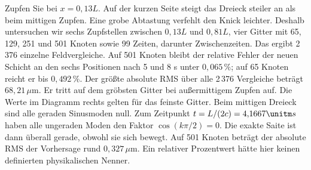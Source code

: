 Zupfen Sie bei \(x=0{,}13L\). Auf der kurzen Seite steigt das Dreieck steiler an als beim mittigen Zupfen. Eine grobe Abtastung verfehlt den Knick leichter. Deshalb untersuchen wir sechs Zupfstellen zwischen \(0{,}13L\) und \(0{,}81L\), vier Gitter mit 65, 129, 251 und 501 Knoten sowie 99 Zeiten, darunter Zwischenzeiten. Das ergibt 2\,376 einzelne Feldvergleiche.
Auf 501 Knoten bleibt der relative Fehler der neuen Schicht an den sechs Positionen nach 5 und 8 s unter \(0{,}065\,\%\); auf 65 Knoten reicht er bis \(0{,}492\,\%\). Der größte absolute RMS über alle 2\,376 Vergleiche beträgt \(68{,}21\,\mu\mathrm m\). Er tritt auf dem gröbsten Gitter bei außermittigem Zupfen auf. Die Werte im Diagramm rechts gelten für das feinste Gitter.
Beim mittigen Dreieck sind alle geraden Sinusmoden null. Zum Zeitpunkt \(t=L/(2c)=4{,}1667\unitm s\) haben alle ungeraden Moden den Faktor \(\cos(k\pi/2)=0\). Die exakte Saite ist dann überall gerade, obwohl sie sich bewegt. Auf 501 Knoten beträgt der absolute RMS der Vorhersage rund \(0{,}327\,\mu\mathrm m\). Ein relativer Prozentwert hätte hier keinen definierten physikalischen Nenner.

